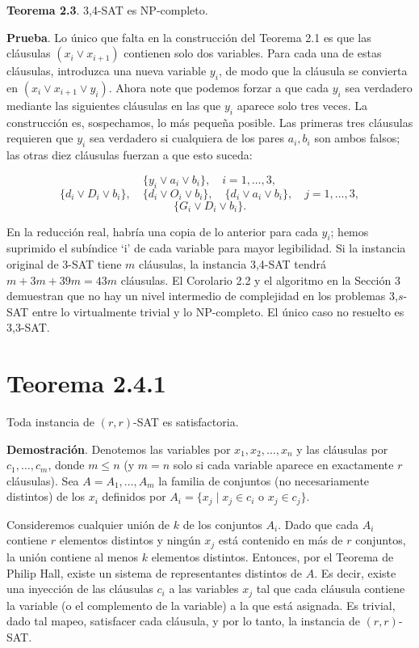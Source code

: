 \documentclass{article}
\begin{document}
\textbf{Teorema 2.3}. 3,4-SAT es NP-completo. 

\textbf{Prueba}. Lo único que falta en la construcción del Teorema 2.1 es que las cláusulas \((x_i \lor x_{i+1})\) contienen solo dos variables. Para cada una de estas cláusulas, introduzca una nueva variable \(y_i\), de modo que la cláusula se convierta en \((x_i \lor x_{i+1} \lor y_i)\). Ahora note que podemos forzar a que cada \(y_i\) sea verdadero mediante las siguientes cláusulas en las que \(y_i\) aparece solo tres veces. La construcción es, sospechamos, lo más pequeña posible. Las primeras tres cláusulas requieren que \(y_i\) sea verdadero si cualquiera de los pares \(a_i, b_i\) son ambos falsos; las otras diez cláusulas fuerzan a que esto suceda:

\[
\{y_i \lor a_i \lor b_i\}, \quad i= 1, \ldots, 3,
\]
\[
\{d_i \lor D_i \lor b_i\}, \quad \{d_i \lor O_i \lor b_i\}, \quad \{d_i \lor a_i \lor b_i\}, \quad j=1, \ldots, 3,
\]
\[
\{G_i \lor D_i \lor b_i\}.
\]

En la reducción real, habría una copia de lo anterior para cada \(y_i\); hemos suprimido el subíndice ‘i’ de cada variable para mayor legibilidad. Si la instancia original de 3-SAT tiene \(m\) cláusulas, la instancia 3,4-SAT tendrá \(m + 3m + 39m = 43m\) cláusulas. El Corolario 2.2 y el algoritmo en la Sección 3 demuestran que no hay un nivel intermedio de complejidad en los problemas 3,\(s\)-SAT entre lo virtualmente trivial y lo NP-completo. El único caso no resuelto es 3,3-SAT.

\section*{Teorema 2.4.1}
Toda instancia de \( (r,r)\)-SAT es satisfactoria.

\textbf{Demostración}. Denotemos las variables por \( x_1, x_2, \ldots, x_n \) y las cláusulas por \( c_1, \ldots, c_m \), donde \( m \leq n \) (y \( m = n \) solo si cada variable aparece en exactamente \( r \) cláusulas). Sea \( A = A_1, \ldots, A_m \) la familia de conjuntos (no necesariamente distintos) de los \( x_i \) definidos por \( A_i = \{x_j \mid x_j \in c_i \text{ o } x_j \in c_j\} \).

Consideremos cualquier unión de \( k \) de los conjuntos \( A_i \). Dado que cada \( A_i \) contiene \( r \) elementos distintos y ningún \( x_j \) está contenido en más de \( r \) conjuntos, la unión contiene al menos \( k \) elementos distintos. Entonces, por el Teorema de Philip Hall, existe un sistema de representantes distintos de \( A \). Es decir, existe una inyección de las cláusulas \( c_i \) a las variables \( x_j \) tal que cada cláusula contiene la variable (o el complemento de la variable) a la que está asignada. Es trivial, dado tal mapeo, satisfacer cada cláusula, y por lo tanto, la instancia de \( (r,r) \)-SAT.
\end{document}
